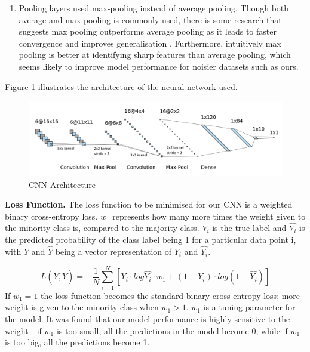 \documentclass[a4paper,11pt]{report}
\begin{document}
\begin{enumerate}
    \item Pooling layers used max-pooling instead of average pooling. Though both average and max pooling is commonly used, there is some research that suggests max pooling outperforms average pooling as it leads to faster convergence and improves generalisation \citep{boureau2010theoretical, scherer2010evaluation}. Furthermore, intuitively max pooling is better at identifying sharp features than average pooling, which seems likely to improve model performance for noisier datasets such as ours.
    
\end{enumerate}
Figure \ref{fig:cnn_architecture} illustrates the architecture of the neural network used. 

\begin{figure}[H]
\begin{center}
\includegraphics[width=\textwidth]{images/cnn_architecture.png}
\caption{CNN Architecture}
\label{fig:cnn_architecture}
\end{center}
\end{figure}

\textbf{Loss Function.} The loss function to be minimised for our CNN is a weighted binary cross-entropy loss. $w_1$ represents how many more times the weight given to the minority class is, compared to the majority class. $Y_i$ is the true label and $\hat{Y_i}$ is the predicted probability of the class label being 1 for a particular data point i, with $Y$ and $\hat{Y}$ being a vector representation of $Y_i$ and $\hat{Y_i}$.

\begin{equation} 
\label{eqn:weighted_bce_loss}
L(Y, \hat{Y}) = - \frac{1}{N} \sum^{N}_{i=1} [Y_i \cdot log \hat{Y_i} \cdot w_1 + (1-Y_i) \cdot log (1-\hat{Y_i})]
\end{equation}
If $w_1 = 1$ the loss function becomes the standard binary cross entropy-loss; more weight is given to the minority class when $w_1 > 1$. $w_1$ is a tuning parameter for the model. It was found that our model performance is highly sensitive to the weight - if $w_1$ is too small, all the predictions in the model become 0, while if $w_1$ is too big, all the predictions become 1.
\end{document}
